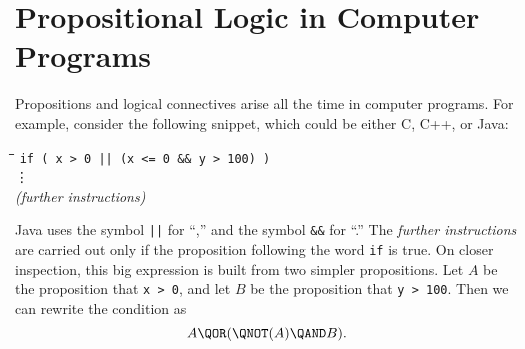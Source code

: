 \begin{problems}

\practiceproblems
{}

\classproblems
{}

\homeworkproblems
{}

\end{problems}


\section{Propositional Logic in Computer Programs}\label{propositions_in_programs_sec}

Propositions and logical connectives arise all the time in computer
programs.  For example, consider the following snippet, which could be
either C, C++, or Java:
\begin{tabbing}
\hspace{1in} \= \quad\quad \= \quad\quad \= \quad\quad \= \kill
\> \texttt{if ( x > 0 || (x <= 0 \&\& y > 100) )} \\
\> \> \vdots\\
\> \textit{(further instructions)}
\end{tabbing}
Java uses the symbol \texttt{||} for ``\QOR,'' and the
symbol \texttt{\&\&} for ``\QAND.''  The \textit{further instructions}
are carried out only if the proposition following the word \texttt{if}
is true.  On closer inspection, this big expression is built from two
simpler propositions.  Let $A$ be the proposition that \texttt{x > 0},
and let $B$ be the proposition that \texttt{y > 100}.  Then we can
rewrite the condition as
\begin{equation}\label{ANAB}
A \QOR (\QNOT(A) \QAND B).
\end{equation}

